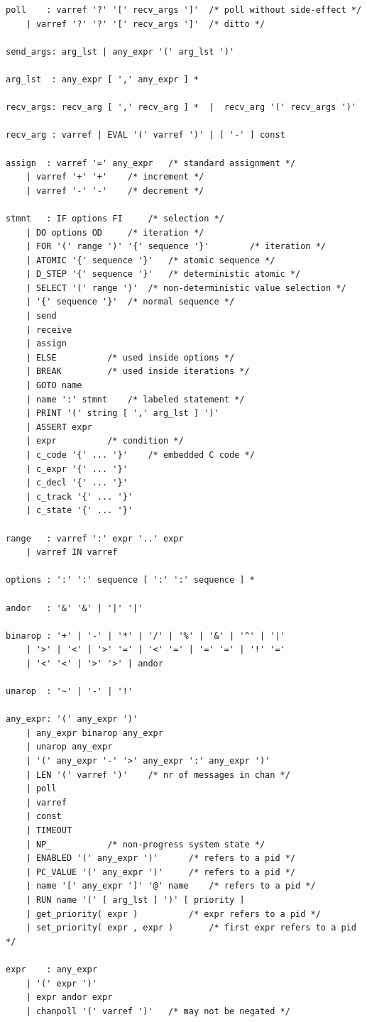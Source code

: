 \documentclass[12pt, twoside]{report}
\begin{document}
\begin{verbatim}
poll    : varref '?' '[' recv_args ']'	/* poll without side-effect */
	| varref '?' '?' '[' recv_args ']'	/* ditto */

send_args: arg_lst | any_expr '(' arg_lst ')'

arg_lst  : any_expr [ ',' any_expr ] *

recv_args: recv_arg [ ',' recv_arg ] *  |  recv_arg '(' recv_args ')'

recv_arg : varref | EVAL '(' varref ')' | [ '-' ] const

assign  : varref '=' any_expr	/* standard assignment */
	| varref '+' '+'	/* increment */
	| varref '-' '-'	/* decrement */

stmnt	: IF options FI		/* selection */
	| DO options OD		/* iteration */
	| FOR '(' range ')' '{' sequence '}'		/* iteration */
	| ATOMIC '{' sequence '}'	/* atomic sequence */
	| D_STEP '{' sequence '}'	/* deterministic atomic */
	| SELECT '(' range ')'	/* non-deterministic value selection */
	| '{' sequence '}'	/* normal sequence */
	| send
	| receive
	| assign
	| ELSE			/* used inside options */
	| BREAK			/* used inside iterations */
	| GOTO name
	| name ':' stmnt	/* labeled statement */
	| PRINT '(' string [ ',' arg_lst ] ')'
	| ASSERT expr
	| expr			/* condition */
	| c_code '{' ... '}'	/* embedded C code */
	| c_expr '{' ... '}'
	| c_decl '{' ... '}'
	| c_track '{' ... '}'
	| c_state '{' ... '}'

range	: varref ':' expr '..' expr
	| varref IN varref

options : ':' ':' sequence [ ':' ':' sequence ] *

andor	: '&' '&' | '|' '|'

binarop	: '+' | '-' | '*' | '/' | '%' | '&' | '^' | '|'
	| '>' | '<' | '>' '=' | '<' '=' | '=' '=' | '!' '='
	| '<' '<' | '>' '>' | andor

unarop	: '~' | '-' | '!'

any_expr: '(' any_expr ')'
	| any_expr binarop any_expr
	| unarop any_expr
	| '(' any_expr '-' '>' any_expr ':' any_expr ')'
	| LEN '(' varref ')'	/* nr of messages in chan */
	| poll
	| varref
	| const
	| TIMEOUT
	| NP_			/* non-progress system state */
	| ENABLED '(' any_expr ')'		/* refers to a pid */
	| PC_VALUE '(' any_expr ')'		/* refers to a pid */
	| name '[' any_expr ']' '@' name	/* refers to a pid */
	| RUN name '(' [ arg_lst ] ')' [ priority ]
	| get_priority( expr )			/* expr refers to a pid */
	| set_priority( expr , expr )		/* first expr refers to a pid */

expr	: any_expr
	| '(' expr ')'
	| expr andor expr
	| chanpoll '(' varref ')'	/* may not be negated */


\end{verbatim}
\end{document}
